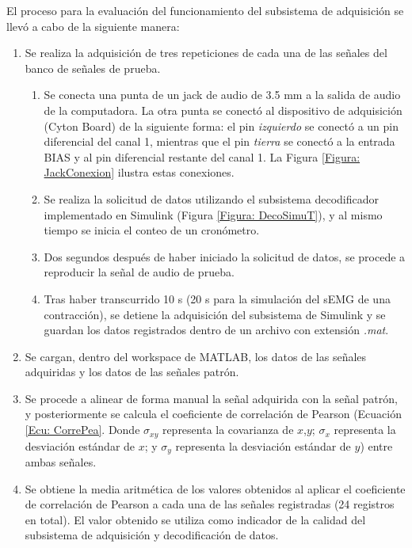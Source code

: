 \newpage
El proceso para la evaluación del funcionamiento del subsistema de adquisición se llevó a cabo de la siguiente manera:
\begin{enumerate}
	\item Se realiza la adquisición de tres repeticiones de cada una de las señales del banco de señales de prueba.
	\begin{enumerate}
		\item Se conecta una punta de un jack de audio de 3.5 mm a la salida de audio de la computadora. La otra punta se conectó al dispositivo de adquisición (Cyton Board) de la siguiente forma: el pin \emph{izquierdo} se conectó a un pin diferencial del canal 1, mientras que el pin \emph{tierra} se conectó a la entrada BIAS y al pin diferencial restante del canal 1. La Figura \ref{Figura: JackConexion} ilustra estas conexiones.
		\item Se realiza la solicitud de datos utilizando el subsistema decodificador implementado en Simulink\textregistered \; (Figura \ref{Figura: DecoSimuT}), y al mismo tiempo se inicia el conteo de un cronómetro.
		\item Dos segundos después de haber iniciado la solicitud de datos, se procede a reproducir la señal de audio de prueba.
		\item Tras haber transcurrido 10 s (20 s para la simulación del sEMG de una contracción), se detiene la adquisición del subsistema de Simulink\textregistered \; y se guardan los datos registrados dentro de un archivo con extensión \emph{.mat}.
	\end{enumerate}
	\item Se cargan, dentro del workspace de MATLAB\textregistered, los datos de las señales adquiridas y los datos de las señales patrón.
	\item Se procede a alinear de forma manual la señal adquirida con la señal patrón, y posteriormente se calcula el coeficiente de correlación de Pearson (Ecuación \ref{Ecu: CorrePea}. Donde $\sigma_{xy}$ representa la covarianza de $x$,$y$; $\sigma_{x}$ representa la desviación estándar de $x$; y $\sigma_{y}$ representa la desviación estándar de $y$) entre ambas señales.
	\item Se obtiene la media aritmética de los valores obtenidos al aplicar el coeficiente de correlación de Pearson a cada una de las señales registradas (24 registros en total). El valor obtenido se utiliza como indicador de la calidad del subsistema de adquisición y decodificación de datos.
\end{enumerate}

